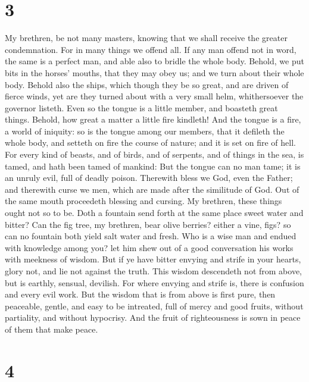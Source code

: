\hypertarget{section-2}{%
\section{3}\label{section-2}}

 My brethren, be not many masters, knowing that we shall
receive the greater condemnation.  For in many things we
offend all. If any man offend not in word, the same is a perfect man,
and able also to bridle the whole body.  Behold, we put bits
in the horses' mouths, that they may obey us; and we turn about their
whole body.  Behold also the ships, which though they be so
great, and are driven of fierce winds, yet are they turned about with a
very small helm, whithersoever the governor listeth.  Even
so the tongue is a little member, and boasteth great things. Behold, how
great a matter a little fire kindleth!  And the tongue is a
fire, a world of iniquity: so is the tongue among our members, that it
defileth the whole body, and setteth on fire the course of nature; and
it is set on fire of hell.  For every kind of beasts, and of
birds, and of serpents, and of things in the sea, is tamed, and hath
been tamed of mankind:  But the tongue can no man tame; it
is an unruly evil, full of deadly poison.  Therewith bless
we God, even the Father; and therewith curse we men, which are made
after the similitude of God.  Out of the same mouth
proceedeth blessing and cursing. My brethren, these things ought not so
to be.  Doth a fountain send forth at the same place sweet
water and bitter?  Can the fig tree, my brethren, bear
olive berries? either a vine, figs? so can no fountain both yield salt
water and fresh.  Who is a wise man and endued with
knowledge among you? let him shew out of a good conversation his works
with meekness of wisdom.  But if ye have bitter envying and
strife in your hearts, glory not, and lie not against the truth.
 This wisdom descendeth not from above, but is earthly,
sensual, devilish.  For where envying and strife is, there
is confusion and every evil work.  But the wisdom that is
from above is first pure, then peaceable, gentle, and easy to be
intreated, full of mercy and good fruits, without partiality, and
without hypocrisy.  And the fruit of righteousness is sown
in peace of them that make peace.

\hypertarget{section-3}{%
\section{4}\label{section-3}}

